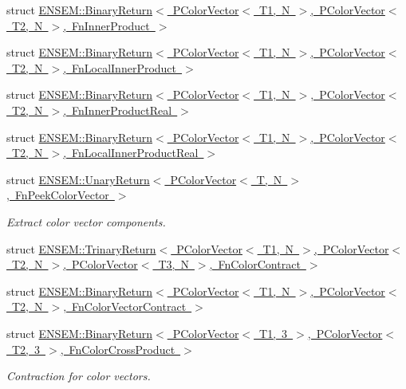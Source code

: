 \begin{DoxyCompactItemize}
\item 
struct \mbox{\hyperlink{structENSEM_1_1BinaryReturn_3_01PColorVector_3_01T1_00_01N_01_4_00_01PColorVector_3_01T2_00_01N_01_4_00_01FnInnerProduct_01_4}{E\+N\+S\+E\+M\+::\+Binary\+Return$<$ P\+Color\+Vector$<$ T1, N $>$, P\+Color\+Vector$<$ T2, N $>$, Fn\+Inner\+Product $>$}}
\item 
struct \mbox{\hyperlink{structENSEM_1_1BinaryReturn_3_01PColorVector_3_01T1_00_01N_01_4_00_01PColorVector_3_01T2_00_01N_ed73dfc7a4532c23f28b4a2b6ca4e4e7}{E\+N\+S\+E\+M\+::\+Binary\+Return$<$ P\+Color\+Vector$<$ T1, N $>$, P\+Color\+Vector$<$ T2, N $>$, Fn\+Local\+Inner\+Product $>$}}
\item 
struct \mbox{\hyperlink{structENSEM_1_1BinaryReturn_3_01PColorVector_3_01T1_00_01N_01_4_00_01PColorVector_3_01T2_00_01N_ff22724b5ff700ded585f8698a23ac47}{E\+N\+S\+E\+M\+::\+Binary\+Return$<$ P\+Color\+Vector$<$ T1, N $>$, P\+Color\+Vector$<$ T2, N $>$, Fn\+Inner\+Product\+Real $>$}}
\item 
struct \mbox{\hyperlink{structENSEM_1_1BinaryReturn_3_01PColorVector_3_01T1_00_01N_01_4_00_01PColorVector_3_01T2_00_01N_c711f7ad00c17cacbd8ce82777076e9d}{E\+N\+S\+E\+M\+::\+Binary\+Return$<$ P\+Color\+Vector$<$ T1, N $>$, P\+Color\+Vector$<$ T2, N $>$, Fn\+Local\+Inner\+Product\+Real $>$}}
\item 
struct \mbox{\hyperlink{structENSEM_1_1UnaryReturn_3_01PColorVector_3_01T_00_01N_01_4_00_01FnPeekColorVector_01_4}{E\+N\+S\+E\+M\+::\+Unary\+Return$<$ P\+Color\+Vector$<$ T, N $>$, Fn\+Peek\+Color\+Vector $>$}}
\begin{DoxyCompactList}\small\item\em Extract color vector components. \end{DoxyCompactList}\item 
struct \mbox{\hyperlink{structENSEM_1_1TrinaryReturn_3_01PColorVector_3_01T1_00_01N_01_4_00_01PColorVector_3_01T2_00_01N4ce572db3e48fe7214a7d25b458894fc}{E\+N\+S\+E\+M\+::\+Trinary\+Return$<$ P\+Color\+Vector$<$ T1, N $>$, P\+Color\+Vector$<$ T2, N $>$, P\+Color\+Vector$<$ T3, N $>$, Fn\+Color\+Contract $>$}}
\item 
struct \mbox{\hyperlink{structENSEM_1_1BinaryReturn_3_01PColorVector_3_01T1_00_01N_01_4_00_01PColorVector_3_01T2_00_01N_62be6e61418b73621b95945775a1489e}{E\+N\+S\+E\+M\+::\+Binary\+Return$<$ P\+Color\+Vector$<$ T1, N $>$, P\+Color\+Vector$<$ T2, N $>$, Fn\+Color\+Vector\+Contract $>$}}
\item 
struct \mbox{\hyperlink{structENSEM_1_1BinaryReturn_3_01PColorVector_3_01T1_00_013_01_4_00_01PColorVector_3_01T2_00_013_ba40478e41b9dc719d7fd5b6b54bac05}{E\+N\+S\+E\+M\+::\+Binary\+Return$<$ P\+Color\+Vector$<$ T1, 3 $>$, P\+Color\+Vector$<$ T2, 3 $>$, Fn\+Color\+Cross\+Product $>$}}
\begin{DoxyCompactList}\small\item\em Contraction for color vectors. \end{DoxyCompactList}\end{DoxyCompactItemize}

